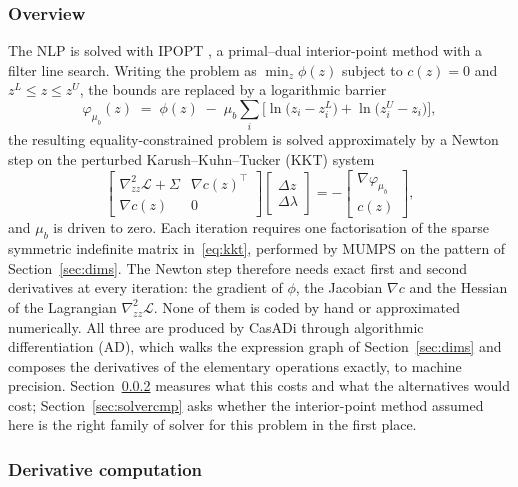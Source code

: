 \documentclass[11pt,a4paper]{article}
\begin{document}
\subsubsection{Overview}
\label{sec:solveroverview}

The NLP is solved with IPOPT \cite{wachter2006ipopt}, a primal--dual interior-point method with a filter
line search. Writing the problem as $\min_z \phi(z)$ subject to $c(z)=0$ and $z^L\le z\le z^U$, the bounds
are replaced by a logarithmic barrier
\begin{equation}
  \varphi_{\mu_b}(z) \;=\; \phi(z) \;-\; \mu_b\sum_i\Big[\ln\!\big(z_i-z_i^L\big)+\ln\!\big(z_i^U-z_i\big)\Big],
  \label{eq:ipopt}
\end{equation}
the resulting equality-constrained problem is solved approximately by a Newton step on the perturbed Karush--Kuhn--Tucker (KKT)
system
\begin{equation}
  \begin{bmatrix}
    \nabla^2_{zz}\mathcal{L} + \Sigma & \nabla c(z)^{\!\top}\\
    \nabla c(z) & 0
  \end{bmatrix}
  \begin{bmatrix}\Delta z\\ \Delta\lambda\end{bmatrix}
  = -\begin{bmatrix}\nabla\varphi_{\mu_b}\\ c(z)\end{bmatrix},
  \label{eq:kkt}
\end{equation}
and $\mu_b$ is driven to zero. Each iteration requires one factorisation of the sparse symmetric indefinite
matrix in~\eqref{eq:kkt}, performed by MUMPS on the pattern of Section~\ref{sec:dims}.
The Newton step therefore needs exact first and second derivatives at every iteration: the gradient
of $\phi$, the Jacobian $\nabla c$ and the Hessian of the Lagrangian $\nabla^2_{zz}\mathcal{L}$.
None of them is coded by hand or approximated numerically. All three are produced by CasADi through
algorithmic differentiation (AD), which walks the expression graph of Section~\ref{sec:dims} and
composes the derivatives of the elementary operations exactly, to machine precision.
Section~\ref{sec:deriv} measures what this costs and what the alternatives would cost;
Section~\ref{sec:solvercmp} asks whether the interior-point method assumed here is the right family
of solver for this problem in the first place.


\subsubsection{Derivative computation}
\label{sec:deriv}
\end{document}
